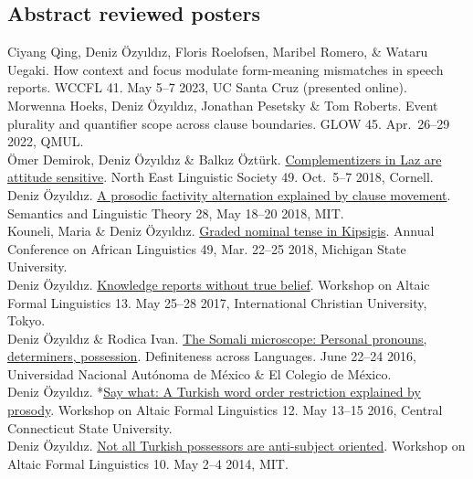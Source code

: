 \documentclass[11pt, a4paper]{article} %
\newcommand{\years}[1]{\marginnote{\scriptsize #1}} %
\newcommand{\me}{Deniz \"Ozy\i{}ld\i{}z}
\begin{document}
\subsection*{Abstract reviewed posters} 
\years{2023} Ciyang Qing, \me, Floris Roelofsen, Maribel Romero, \& Wataru
Uegaki. How context and focus modulate form-meaning mismatches in speech
reports. WCCFL 41. May 5--7 2023, UC Santa Cruz (presented online). \\[.25em]
\years{2022} Morwenna Hoeks, Deniz \"Ozy\i{}ld\i{}z, Jonathan Pesetsky \& Tom Roberts. Event plurality and quantiﬁer scope across clause boundaries. GLOW 45. Apr.\ 26--29 2022, QMUL.\\[.25em]
\years{2018} \"Omer Demirok, Deniz \"Ozy\i{}ld\i{}z \& Balk\i{}z \"Ozt\"urk. \href{http://deniz.fr/pdfs/2018-nels-poster.pdf}{Complementizers in Laz are attitude sensitive}. North East Linguistic Society 49. Oct.\ 5--7 2018, Cornell.\\[.25em]
\me. \href{http://deniz.fr/pdfs/2018-salt-poster.pdf}{A prosodic factivity alternation explained by clause movement}. Semantics and Linguistic Theory 28, May 18--20 2018, MIT.\\[.25em]
Kouneli, Maria \& Deniz \"Ozy\i{}ld\i{}z. \href{http://deniz.fr/pdfs/2018acal-gradedntkipsigis.pdf}{Graded nominal tense in Kipsigis}. Annual Conference on African Linguistics 49, Mar. 22--25 2018, Michigan State University.\\[.25em]
\years{2017} \me. \href{http://www.deniz.fr/pdfs/2017-wafl.pdf}{Knowledge reports without true belief}. Workshop on Altaic Formal Linguistics 13. May 25--28 2017, International Christian University, Tokyo. \\[.25em]
\years{2016} \me{} \&  Rodica Ivan.
\href{http://www.deniz.fr/pdfs/2016-dal-poster.pdf}{The Somali microscope:
Personal pronouns, determiners, possession}. Definiteness across Languages. June
22--24 2016, Universidad Nacional Aut\'onoma de M\'exico \& El Colegio de
M\'exico.\\[.25em]
\me. *\href{http://www.deniz.fr/pdfs/2016-wafl-poster.pdf}{Say what: A Turkish word order restriction explained by prosody}. Workshop on Altaic Formal Linguistics 12. May 13--15 2016, Central Connecticut State University.\\[.25em]
\years{2014} \me. \href{http://deniz.fr/pdfs/possessives_poster.pdf}{Not all Turkish possessors are anti-subject oriented}. Workshop on Altaic Formal Linguistics 10. May 2--4 2014, MIT.
\end{document}
